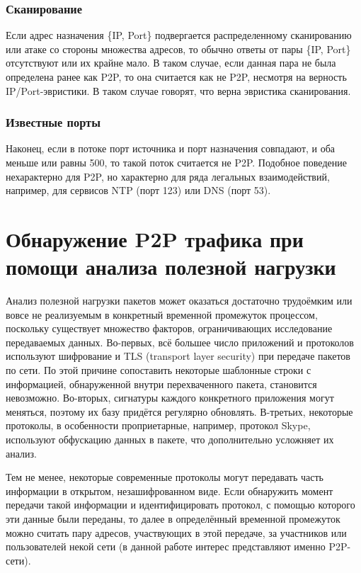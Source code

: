 \documentclass[bachelor, och, coursework]{SCWorks}
\begin{document}
\subsubsection{Сканирование}
Если адрес назначения \{IP, Port\} подвергается распределенному сканированию или атаке со
стороны множества адресов, то обычно ответы от пары \{IP, Port\} отсутствуют или их крайне мало. В таком случае, если данная пара не была определена ранее как P2P, то она считается как не P2P, несмотря на верность IP/Port-эвристики. В таком случае говорят, что верна эвристика сканирования.

\subsubsection{Известные порты}
Наконец, если в потоке порт источника и порт назначения совпадают, и оба меньше или равны 500, то такой поток считается не P2P. Подобное поведение нехарактерно для P2P, но характерно для ряда легальных взаимодействий, например, для сервисов NTP (порт 123) или DNS (порт 53). 

\section{Обнаружение P2P трафика при помощи анализа полезной нагрузки}
Анализ полезной нагрузки пакетов может оказаться достаточно трудоёмким или вовсе не реализуемым в конкретный временной промежуток процессом, поскольку существует множество факторов, ограничивающих исследование передаваемых данных. Во-первых, всё большее число приложений и протоколов используют шифрование и TLS (transport layer security) при передаче пакетов по сети. По этой причине сопоставить некоторые шаблонные строки с информацией, обнаруженной внутри перехваченного пакета, становится невозможно. Во-вторых, сигнатуры каждого конкретного приложения могут меняться, поэтому их базу придётся регулярно обновлять. В-третьих, некоторые протоколы, в особенности проприетарные, например, протокол Skype, используют обфускацию данных в пакете, что дополнительно усложняет их анализ. 

Тем не менее, некоторые современные протоколы могут передавать часть информации в открытом, незашифрованном виде. Если обнаружить момент передачи такой информации и идентифицировать протокол, с помощью которого эти данные были переданы, то далее в определённый временной промежуток можно считать пару адресов, участвующих в этой передаче, за участников или пользователей некой сети (в данной работе интерес представляют именно P2P-сети).
\end{document}

